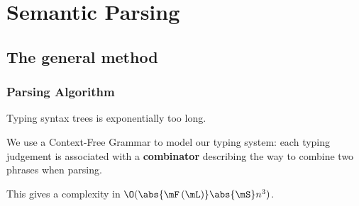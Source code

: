 \documentclass[math, english, info]{beamercours}
\begin{document}
\section{Semantic Parsing}
\subsection{The general method}
\begin{frame}
	\frametitle{Parsing Algorithm}
	Typing syntax trees is exponentially too long.

	\pause\medskip

	We use a Context-Free Grammar to model our typing system:
	each typing judgement is associated with a \textbf{combinator} describing the
	way to combine two phrases when parsing.

	\smallskip\pause

	This gives a complexity in $\O(\abs{\mF\left(\mL\right)}\abs{\mS}n^{3})$.
\end{frame}
\end{document}
